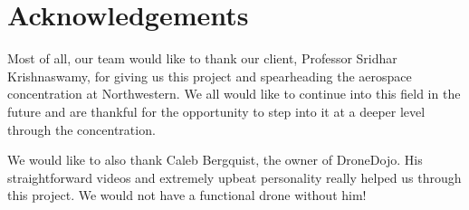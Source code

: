 \chapter{Acknowledgements}

Most of all, our team would like to thank our client, Professor Sridhar Krishnaswamy, for giving us this project and spearheading the aerospace concentration at Northwestern. We all would like to continue into this field in the future and are thankful for the opportunity to step into it at a deeper level through the concentration.

We would like to also thank Caleb Bergquist, the owner of DroneDojo. His straightforward videos and extremely upbeat personality really helped us through this project. We would not have a functional drone without him!